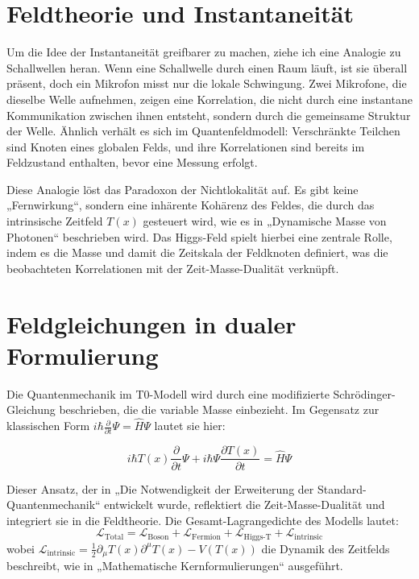 \documentclass[a4paper,12pt]{article}
\newcommand{\Tfield}{T(x)}
\theoremstyle{definition}
\theoremstyle{remark}
\begin{document}
	\section{Feldtheorie und Instantaneität}
	
	Um die Idee der Instantaneität greifbarer zu machen, ziehe ich eine Analogie zu Schallwellen heran. Wenn eine Schallwelle durch einen Raum läuft, ist sie überall präsent, doch ein Mikrofon misst nur die lokale Schwingung. Zwei Mikrofone, die dieselbe Welle aufnehmen, zeigen eine Korrelation, die nicht durch eine instantane Kommunikation zwischen ihnen entsteht, sondern durch die gemeinsame Struktur der Welle. Ähnlich verhält es sich im Quantenfeldmodell: Verschränkte Teilchen sind Knoten eines globalen Felds, und ihre Korrelationen sind bereits im Feldzustand enthalten, bevor eine Messung erfolgt.
	
	Diese Analogie löst das Paradoxon der Nichtlokalität auf. Es gibt keine „Fernwirkung“, sondern eine inhärente Kohärenz des Feldes, die durch das intrinsische Zeitfeld \(\Tfield\) gesteuert wird, wie es in „Dynamische Masse von Photonen“ \cite{pascher_photons_2025} beschrieben wird. Das Higgs-Feld spielt hierbei eine zentrale Rolle, indem es die Masse und damit die Zeitskala der Feldknoten definiert, was die beobachteten Korrelationen mit der Zeit-Masse-Dualität verknüpft.
	
	\section{Feldgleichungen in dualer Formulierung}
	
	Die Quantenmechanik im T0-Modell wird durch eine modifizierte Schrödinger-Gleichung beschrieben, die die variable Masse einbezieht. Im Gegensatz zur klassischen Form \(i\hbar \frac{\partial}{\partial t} \Psi = \hat{H} \Psi\) lautet sie hier:
	
	\begin{equation}
		i\hbar \Tfield \frac{\partial}{\partial t} \Psi + i\hbar \Psi \frac{\partial \Tfield}{\partial t} = \hat{H} \Psi
	\end{equation}
	
	Dieser Ansatz, der in „Die Notwendigkeit der Erweiterung der Standard-Quantenmechanik“ \cite{pascher_quantum_2025} entwickelt wurde, reflektiert die Zeit-Masse-Dualität und integriert sie in die Feldtheorie. Die Gesamt-Lagrangedichte des Modells lautet:
	\begin{equation}
		\mathcal{L}_{\text{Total}} = \mathcal{L}_{\text{Boson}} + \mathcal{L}_{\text{Fermion}} + \mathcal{L}_{\text{Higgs-T}} + \mathcal{L}_{\text{intrinsic}}
	\end{equation}
	wobei \(\mathcal{L}_{\text{intrinsic}} = \frac{1}{2} \partial_\mu \Tfield \partial^\mu \Tfield - V(\Tfield)\) die Dynamik des Zeitfelds beschreibt, wie in „Mathematische Kernformulierungen“ \cite{pascher_lagrange_2025} ausgeführt.
	
\end{document}
